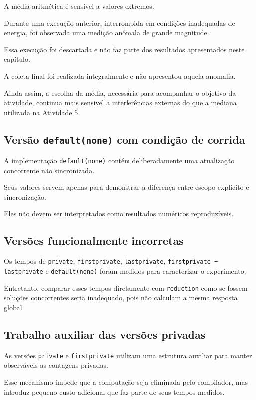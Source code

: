 A média aritmética é sensível a valores extremos.

Durante uma execução anterior, interrompida em condições inadequadas de
energia, foi observada uma medição anômala de grande magnitude.

Essa execução foi descartada e não faz parte dos resultados apresentados
neste capítulo.

A coleta final foi realizada integralmente e não apresentou aquela
anomalia.

Ainda assim, a escolha da média, necessária para acompanhar o objetivo da
atividade, continua mais sensível a interferências externas do que a
mediana utilizada na Atividade 5.


\subsection{Versão \texttt{default(none)} com condição de corrida}

A implementação \texttt{default(none)} contém deliberadamente uma atualização
concorrente não sincronizada.

Seus valores servem apenas para demonstrar a diferença entre escopo explícito
e sincronização.

Eles não devem ser interpretados como resultados numéricos reproduzíveis.


\subsection{Versões funcionalmente incorretas}

Os tempos de \texttt{private}, \texttt{firstprivate},
\texttt{lastprivate}, \texttt{firstprivate + lastprivate} e
\texttt{default(none)} foram medidos para caracterizar o experimento.

Entretanto, comparar esses tempos diretamente com \texttt{reduction} como
se fossem soluções concorrentes seria inadequado, pois não calculam a mesma
resposta global.


\subsection{Trabalho auxiliar das versões privadas}

As versões \texttt{private} e \texttt{firstprivate} utilizam uma estrutura
auxiliar para manter observáveis as contagens privadas.

Esse mecanismo impede que a computação seja eliminada pelo compilador, mas
introduz pequeno custo adicional que faz parte de seus tempos medidos.


